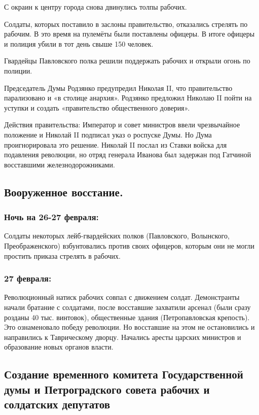 С окраин к центру города снова двинулись толпы рабочих.

Солдаты, которых поставило в заслоны правительство, отказались стрелять по рабочим. В это время на пулемёты были поставлены офицеры. В итоге офицеры и полиция убили в тот день свыше 150 человек.

Гвардейцы Павловского полка решили поддержать рабочих и открыли огонь по полиции.

Председатель Думы Родзянко предупредил Николая II, что правительство парализовано и «в столице анархия». Родзянко предложил Николаю II пойти на уступки и создать «правительство общественного доверия».

Действия правительства: Император и совет министров ввели чрезвычайное положение и Николай II подписал указ о роспуске Думы. Но Дума проигнорировала это решение. Николай II послал из Ставки войска для подавления революции, но отряд генерала Иванова был задержан под Гатчиной восставшими железнодорожниками.

\subsection{Вооруженное восстание.}

\subsubsection{\textbf{Ночь на 26-27 февраля:}}

Солдаты некоторых лейб-гвардейских полков (Павловского, Волынского, Преображенского) взбунтовались против своих офицеров, которым они не могли простить приказа стрелять в рабочих.

\subsubsection{\textbf{27 февраля:}}

Революционный натиск рабочих совпал с движением солдат. Демонстранты начали братание с солдатами, после восставшие захватили арсенал (были сразу розданы 40 тыс. винтовок), общественные здания (Петропавловская крепость). Это ознаменовало победу революции. Но восставшие на этом не остановились и направились к Таврическому дворцу. Начались аресты царских министров и образование новых органов власти.

\subsection{Создание временного комитета Государственной думы и Петроградского совета рабочих и солдатских депутатов}

